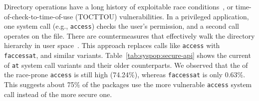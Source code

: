 Directory operations have a long history of exploitable race conditions~\citep{tocttou-truck, wei05fast, races-usenix05}, or time-of-check-to-time-of-use (TOCTTOU) vulnerabilities.
In a privileged application, one system call (e.g., {\tt access}) checks 
the user's permission, and a second call operates on the file.
There are countermeasures that effectively walk the directory
hierarchy in user space~\citep{tsafrir08tr}.
This approach replaces calls like {\tt access} with {\tt faccessat},
and similar variants.
Table~\ref{tab:syspop:secure-api} shows the current \unwusagemetric{} of
{\tt *at} system call variants and their older counterparts.
We observed that the \unwusagemetric{} of
the race-prone {\tt access} is still high (74.24\%), whereas {\tt faccessat} is only 0.63\%.
This suggests about 75\% of the
packages use the more vulnerable {\tt access} system call instead of the more secure one.

